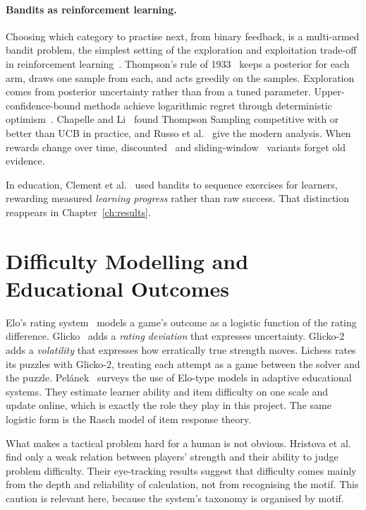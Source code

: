 \paragraph{Bandits as reinforcement learning.} Choosing which category to practise next, from
binary feedback, is a multi-armed bandit problem, the simplest setting of the exploration and
exploitation trade-off in reinforcement learning~\cite{sutton2018reinforcement}. Thompson's rule of
1933~\cite{thompson1933likelihood} keeps a posterior for each arm, draws one sample from each, and
acts greedily on the samples. Exploration comes from posterior uncertainty rather than from a tuned
parameter. Upper-confidence-bound methods achieve logarithmic regret through deterministic
optimism~\cite{auer2002finite}. Chapelle and Li~\cite{chapelle2011empirical} found Thompson Sampling
competitive with or better than UCB in practice, and Russo et al.~\cite{russo2018tutorial} give the
modern analysis. When rewards change over time, discounted~\cite{raj2017taming} and
sliding-window~\cite{garivier2011upper} variants forget old evidence.

In education, Clement et al.~\cite{clement2015multi} used bandits to sequence exercises for learners,
rewarding measured \emph{learning progress} rather than raw success. That distinction reappears in
Chapter~\ref{ch:results}.

\section{Difficulty Modelling and Educational Outcomes}

Elo's rating system~\cite{elo1978rating} models a game's outcome as a logistic function of the
rating difference. Glicko~\cite{glickman1999parameter} adds a \emph{rating deviation} that expresses
uncertainty. Glicko-2~\cite{glickman2012example} adds a \emph{volatility} that expresses how
erratically true strength moves. Lichess rates its puzzles with Glicko-2, treating each attempt as a
game between the solver and the puzzle. Pelánek~\cite{pelanek2016applications} surveys the use of
Elo-type models in adaptive educational systems. They estimate learner ability and item difficulty
on one scale and update online, which is exactly the role they play in this project. The same
logistic form is the Rasch model of item response theory.

What makes a tactical problem hard for a human is not obvious. Hristova et
al.~\cite{hristova2014assessing} find only a weak relation between players' strength and their
ability to judge problem difficulty. Their eye-tracking results suggest that difficulty comes mainly
from the depth and reliability of calculation, not from recognising the motif. This caution is
relevant here, because the system's taxonomy is organised by motif.

